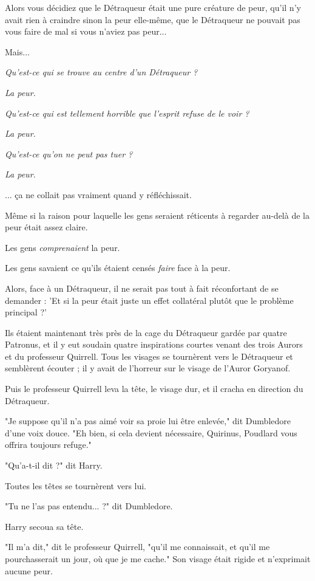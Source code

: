 Alors vous décidiez que le Détraqueur était une pure créature de peur, qu'il n'y avait rien à craindre sinon la peur elle-même, que le Détraqueur ne pouvait pas vous faire de mal si vous n'aviez pas peur...

Mais...

\emph{Qu'est-ce qui se trouve au centre d'un Détraqueur ?} 

\emph{La peur.} 

\emph{Qu'est-ce qui est tellement horrible que l'esprit refuse de le voir ?} 

\emph{La peur.} 

\emph{Qu'est-ce qu'on ne peut pas tuer ?} 

\emph{La peur.} 

... ça ne collait pas vraiment quand y réfléchissait.

Même si la raison pour laquelle les gens seraient réticents à regarder au-delà de la peur était assez claire.

Les gens \emph{comprenaient}  la peur.

Les gens savaient ce qu'ils étaient censés \emph{faire}  face à la peur.

Alors, face à un Détraqueur, il ne serait pas tout à fait réconfortant de se demander : 'Et si la peur était juste un effet collatéral plutôt que le problème principal ?'

Ils étaient maintenant très près de la cage du Détraqueur gardée par quatre Patronus, et il y eut soudain quatre inspirations courtes venant des trois Aurors et du professeur Quirrell. Tous les visages se tournèrent vers le Détraqueur et semblèrent écouter ; il y avait de l'horreur sur le visage de l'Auror Goryanof.

Puis le professeur Quirrell leva la tête, le visage dur, et il cracha en direction du Détraqueur.

"Je suppose qu'il n'a pas aimé voir sa proie lui être enlevée," dit Dumbledore d'une voix douce. "Eh bien, si cela devient nécessaire, Quirinus, Poudlard vous offrira toujours refuge."

"Qu'a-t-il dit ?" dit Harry.

Toutes les têtes se tournèrent vers lui.

"Tu ne l'as pas entendu... ?" dit Dumbledore.

Harry secoua sa tête.

"Il m'a dit," dit le professeur Quirrell, "qu'il me connaissait, et qu'il me pourchasserait un jour, où que je me cache." Son visage était rigide et n'exprimait aucune peur.


